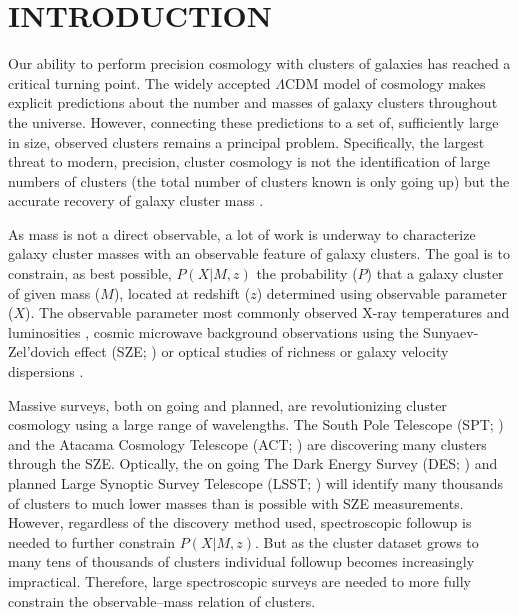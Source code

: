 \documentclass[fleqn,usenatbib]{mnras}
\begin{document}
\section{INTRODUCTION}
Our ability to perform precision cosmology with clusters of galaxies has reached a critical turning point. The widely accepted $\Lambda$CDM model of cosmology makes explicit predictions about the number and masses of galaxy clusters throughout the universe. However, connecting these predictions to a set of, sufficiently large in size, observed clusters remains a principal problem. Specifically, the largest threat to modern, precision, cluster cosmology is not the identification of large numbers of clusters (the total number of clusters known is only going up) but the accurate recovery of galaxy cluster mass .

As mass is not a direct observable, a lot of work is underway to characterize galaxy cluster masses with an observable feature of galaxy clusters. The goal is to constrain, as best possible, $P(X|M,z)$ the probability ($P$) that a galaxy cluster of given mass ($M$), located at redshift ($z$) determined using observable parameter ($X$). The observable parameter most commonly observed X-ray temperatures and luminosities , cosmic microwave background observations  using the Sunyaev-Zel'dovich effect (SZE; \citealt{Sunyaev1972}) or optical studies  of richness  or galaxy velocity dispersions .

Massive surveys, both on going and planned, are revolutionizing cluster cosmology using a large range of wavelengths. The South Pole Telescope (SPT; \citealt{Carlstrom2011}) and the Atacama Cosmology Telescope (ACT; \citealt{Swetz2011}) are discovering many clusters through the SZE. Optically, the on going The Dark Energy Survey (DES; \citealt{DES2005}) and planned Large Synoptic Survey Telescope (LSST; \citealt{LSST2012}) will identify many thousands of clusters to much lower masses than is possible with SZE measurements. However, regardless of the discovery method used, spectroscopic followup is needed to further constrain $P(X|M,z)$. But as the cluster dataset grows to many tens of thousands of clusters individual followup becomes increasingly impractical. Therefore, large spectroscopic surveys are needed to more fully constrain the observable--mass relation of clusters.
\end{document}
